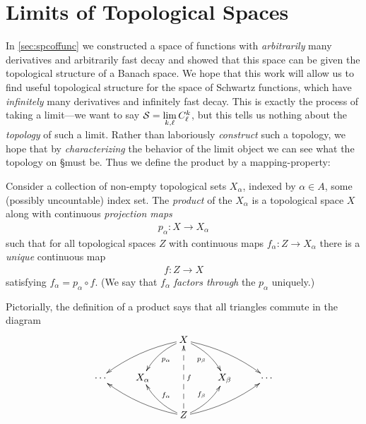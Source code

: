     \section{Limits of Topological Spaces}
      
      \noindent
      In \autoref{sec:spcoffunc} we constructed a space of functions with \emph{arbitrarily} many derivatives and arbitrarily fast decay and showed that this space can be given the topological structure of a Banach space.
      We hope that this work will allow us to find useful topological structure for the space of Schwartz functions, which have \emph{infinitely} many derivatives and infinitely fast decay.
      This is exactly the process of taking a limit---we want to say $\S=\lim\limits_{k,\ell}C^k_\ell$, but this tells us nothing about the \emph{topology} of such a limit.
      Rather than laboriously \emph{construct} such a topology, we hope that by \emph{characterizing} the behavior of the limit object we can see what the topology on \S must be.
      Thus we define the product by a mapping-property:
%
      \begin{defn}
        Consider a collection of non-empty topological sets $X_\alpha$, indexed by $\alpha\in A$, some (possibly uncountable) index set.
        The \emph{product} of the $X_\alpha$ is a topological space $X$ along with continuous \emph{projection maps} 
        \begin{align*}
          p_\alpha:X\longrightarrow X_\alpha
        \end{align*}
        such that for all topological spaces $Z$ with continuous maps $f_\alpha:Z\rightarrow X_\alpha$ there is a \emph{unique} continuous map 
        \begin{align*}
          f:Z\longrightarrow X
        \end{align*}
        satisfying $f_\alpha=p_\alpha\circ f$.
        (We say that $f_\alpha$ \emph{factors through} the $p_\alpha$ uniquely.)
      \end{defn}
      Pictorially, the definition of a product says that all triangles commute in the diagram
      \begin{displaymath}
        \xymatrix{
          && X \ar@/_/[dll] \ar@/_/[dl]^{p_\alpha} \ar@/^/[dr]_{p_\beta} \ar@/^/[drr] \\
          \cdots & X_\alpha && X_\beta & \cdots\\
          && Z \ar@/^/[ull] \ar@/^/[ul]_{f_\alpha} \ar@{-->}[uu]_f \ar@/_/[ur]^{f_\beta} \ar@/_/[urr]
         }
      \end{displaymath}


